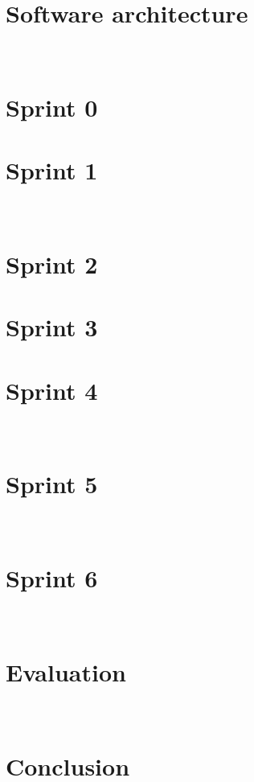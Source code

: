 \documentclass[11pt, twoside]{report}
\newcommand{\newpageDL}{\newpage ~}
\begin{document}
\chapter{Software architecture}


\newpageDL

\chapter{Sprint 0}


\chapter{Sprint 1}


\newpageDL

\chapter{Sprint 2}


\chapter{Sprint 3}


\chapter{Sprint 4}


\newpageDL

\chapter{Sprint 5}


\newpageDL

\chapter{Sprint 6}


\newpageDL

\chapter{Evaluation}


\newpageDL

\chapter{Conclusion}


\begin{flushleft}
	
	
\end{flushleft}

\appendix

\end{document}
